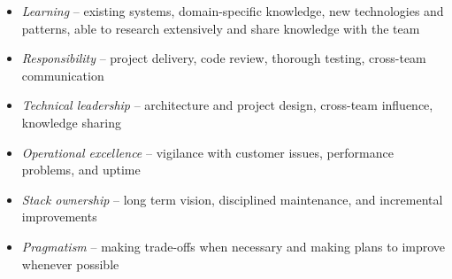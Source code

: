 \begin{multicols}{2}
\begin{itemize}
    \item \textit{Learning} – existing systems, domain-specific knowledge, new technologies and patterns, able to research extensively and share knowledge with the team
    \item \textit{Responsibility} – project delivery, code review, thorough testing, cross-team communication
    \item \textit{Technical leadership} – architecture and project design, cross-team influence, knowledge sharing
    \item \textit{Operational excellence} – vigilance with customer issues, performance problems, and uptime
    \item \textit{Stack ownership} – long term vision, disciplined maintenance, and incremental improvements
    \item \textit{Pragmatism} – making trade-offs when necessary and making plans to improve whenever possible
\end{itemize}
\end{multicols}
